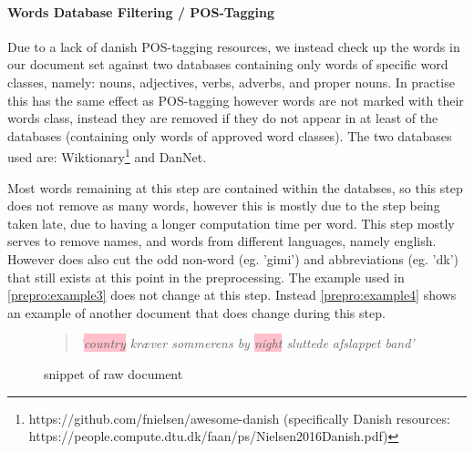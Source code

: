 \paragraph{Words Database Filtering / POS-Tagging}
Due to a lack of danish POS-tagging resources, we instead check up the words in our document set against two databases containing only words of specific word classes, namely: nouns, adjectives, verbs, adverbs, and proper nouns.
In practise this has the same effect as POS-tagging however words are not marked with their words class, instead they are removed if they do not appear in at least of the databases (containing only words of approved word classes).
The two databases used are:  Wiktionary\footnote{https://github.com/fnielsen/awesome-danish (specifically Danish resources: https://people.compute.dtu.dk/faan/ps/Nielsen2016Danish.pdf)} and DanNet\cite{Pedersen2009DanNetTC}. 

Most words remaining at this step are contained within the databses, so this step does not remove as many words, however this is mostly due to the step being taken late, due to having a longer computation time per word.
This step mostly serves to remove names, and words from different languages, namely english.
However does also cut the odd non-word (eg. 'gimi') and abbreviations (eg. 'dk') that still exists at this point in the preprocessing.
The example used in \autoref{prepro:example3} does not change at this step. Instead \autoref{prepro:example4} shows an example of another document that does change during this step.

\begin{figure}[h]
	\begin{quote}
		\textit{
			'\colorbox{pink}{country} kræver sommerens by \colorbox{pink}{night} sluttede afslappet band'
		}
	\end{quote}
	\caption{snippet of raw document}
	\label{prepro:example4}
\end{figure}

